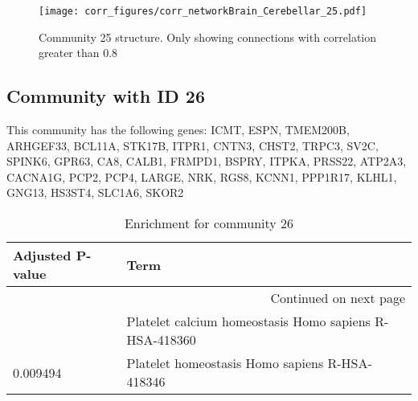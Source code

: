 \begin{figure}[h!]
\centering
\texttt{[image: corr\_figures/corr\_networkBrain\_Cerebellar\_25.pdf]}
\caption{Community 25 structure. Only showing connections with correlation greater than 0.8}
\end{figure}




\subsection*{Community with ID 26}
This community has the following genes: ICMT, ESPN, TMEM200B, ARHGEF33, BCL11A, STK17B, ITPR1, CNTN3, CHST2, TRPC3, SV2C, SPINK6, GPR63, CA8, CALB1, FRMPD1, BSPRY, ITPKA, PRSS22, ATP2A3, CACNA1G, PCP2, PCP4, LARGE, NRK, RGS8, KCNN1, PPP1R17, KLHL1, GNG13, HS3ST4, SLC1A6, SKOR2
\\
\begin{longtable}{p{2.4cm}p{14.5cm}}
\caption{Enrichment for community 26}\\
\toprule
Adjusted \newline P-value &                                                    Term \\
\midrule
\endhead
\midrule
\multicolumn{2}{r}{{Continued on next page}} \\
\midrule
\endfoot

\bottomrule
\endlastfoot
                 0.017826 &  Platelet calcium homeostasis Homo sapiens R-HSA-418360 \\
                 0.009494 &          Platelet homeostasis Homo sapiens R-HSA-418346 \\
\end{longtable}


